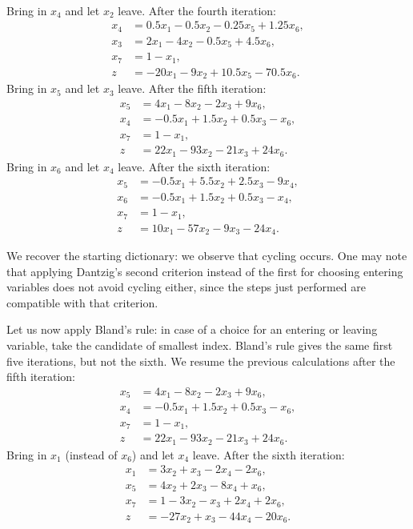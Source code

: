 \begin{example}
\[\begin{aligned}
        \end{aligned}
    \]
    Bring in \(x_4\) and let \(x_2\) leave. After the fourth iteration:
    \[
        \begin{aligned}
        x_4 &= 0.5x_1 - 0.5x_2 - 0.25x_5 + 1.25x_6,\\
        x_3 &= 2x_1 - 4x_2 - 0.5x_5 + 4.5x_6,\\
        x_7 &= 1 - x_1,\\
        \hline
        z &= -20x_1 - 9x_2 + 10.5x_5 - 70.5x_6.
        \end{aligned}
    \]
    Bring in \(x_5\) and let \(x_3\) leave. After the fifth iteration:
    \[
        \begin{aligned}
        x_5 &= 4x_1 - 8x_2 - 2x_3 + 9x_6,\\
        x_4 &= -0.5x_1 + 1.5x_2 + 0.5x_3 - x_6,\\
        x_7 &= 1 - x_1,\\
        \hline
        z &= 22x_1 - 93x_2 - 21x_3 + 24x_6.
        \end{aligned}
    \]
    Bring in \(x_6\) and let \(x_4\) leave. After the sixth iteration:
    \[
        \begin{aligned}
        x_5 &= -0.5x_1 + 5.5x_2 + 2.5x_3 - 9x_4,\\
        x_6 &= -0.5x_1 + 1.5x_2 + 0.5x_3 - x_4,\\
        x_7 &= 1 - x_1,\\
        \hline
        z &= 10x_1 - 57x_2 - 9x_3 - 24x_4.
        \end{aligned}
    \]

    We recover the starting dictionary: we observe that cycling occurs. One may note that applying Dantzig’s second criterion instead of the first for choosing entering variables does not avoid cycling either, since the steps just performed are compatible with that criterion.

    Let us now apply Bland’s rule: in case of a choice for an entering or leaving variable, take the candidate of smallest index. Bland’s rule gives the same first five iterations, but not the sixth. We resume the previous calculations after the fifth iteration:
    \[
        \begin{aligned}
        x_5 &= 4x_1 - 8x_2 - 2x_3 + 9x_6,\\
        x_4 &= -0.5x_1 + 1.5x_2 + 0.5x_3 - x_6,\\
        x_7 &= 1 - x_1,\\
        \hline
        z &= 22x_1 - 93x_2 - 21x_3 + 24x_6.
        \end{aligned}
    \]
    Bring in \(x_1\) (instead of \(x_6\)) and let \(x_4\) leave. After the sixth iteration:
    \[
        \begin{aligned}
        x_1 &= 3x_2 + x_3 - 2x_4 - 2x_6,\\
        x_5 &= 4x_2 + 2x_3 - 8x_4 + x_6,\\
        x_7 &= 1 - 3x_2 - x_3 + 2x_4 + 2x_6,\\
        \hline
        z &= -27x_2 + x_3 - 44x_4 - 20x_6.
        \end{aligned}
    \]


\end{example}
